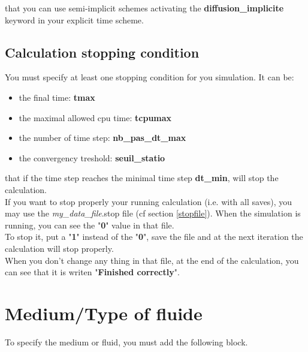 \Note that you can use semi-implicit schemes activating the \textbf{diffusion\_implicite} keyword in your explicit time scheme.



\subsection{Calculation stopping condition}
You must specify at least one stopping condition for you simulation.
It can be:
\begin{itemize}
\item the final time: \textbf{tmax}
\item the maximal allowed cpu time: \textbf{tcpumax}
\item the number of time step: \textbf{nb\_pas\_dt\_max}
\item the convergency treshold: \textbf{seuil\_statio}
\end{itemize}

\Note that if the time step reaches the minimal time step \textbf{dt\_min}, \trust will stop the calculation.\\

If you want to stop properly your running calculation (i.e. with all saves), you may use the \textit{my\_data\_file}.stop file (cf section \ref{stopfile}).
When the simulation is running, you can see the "\textbf{0}" value in that file.\\

To stop it, put a "\textbf{1}" instead of the "\textbf{0}", save the file and at the next iteration the calculation will stop properly.\\

When you don't change any thing in that file, at the end of the calculation, you can see that it is writen "\textbf{Finished correctly}".


\section{Medium/Type of fluide}
To specify the medium or fluid, you must add the following block.

    \begin{center}
    \end{center}

